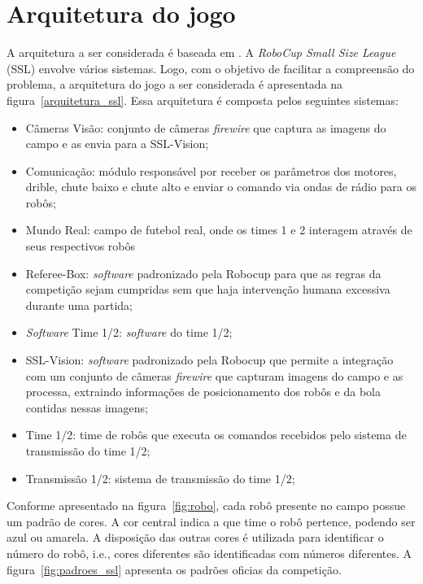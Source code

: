 \section{Arquitetura do jogo}

A arquitetura a ser considerada é baseada em \cite{felixnavarro}.
A \textit{RoboCup Small Size League} (SSL) envolve vários sistemas.
Logo, com o objetivo de facilitar a compreensão do problema, a
arquitetura do jogo a ser considerada é apresentada na
figura~\ref{arquitetura_ssl}. Essa arquitetura é composta pelos
seguintes sistemas:

\begin{itemize}
  \item Câmeras Visão: conjunto de câmeras \textit{firewire} que captura as imagens do
        campo e as envia para a SSL-Vision;
  \item Comunicação: módulo responsável por receber os parâmetros
        dos motores, drible, chute baixo e chute alto e enviar o comando via
        ondas de rádio para os robôs;
  \item Mundo Real: campo de futebol real, onde os times 1 e 2 interagem
        através de seus respectivos robôs
  \item Referee-Box: \textit{software} padronizado pela Robocup para que as
        regras da competição sejam cumpridas sem que haja intervenção
        humana excessiva durante uma partida;
  \item \textit{Software} Time 1/2: \textit{software} do time 1/2;
  \item SSL-Vision: \textit{software} padronizado pela Robocup que permite a
        integração com um conjunto de câmeras \textit{firewire} que capturam
        imagens do campo e as processa, extraindo informações de posicionamento
        dos robôs e da bola contidas nessas imagens;
  \item Time 1/2: time de robôs que executa os comandos recebidos pelo
        sistema de transmissão do time 1/2;
  \item Transmissão 1/2: sistema de transmissão do time 1/2;
\end{itemize}

Conforme apresentado na figura~\ref{fig:robo}, cada robô presente no campo possue
um padrão de cores. A cor central indica a que time o robô pertence, podendo ser
azul ou amarela. A disposição das outras cores é utilizada para identificar o número
do robô, i.e., cores diferentes são identificadas com números diferentes. A
figura~\ref{fig:padroes_ssl} apresenta os padrões oficias da competição.

